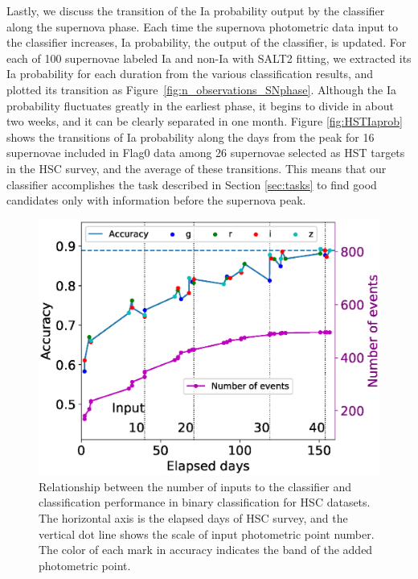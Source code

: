 \documentclass[useamsfonts]{pasj01}
\begin{document}
Lastly, we discuss the transition of the Ia probability output by the classifier along the supernova phase.
Each time the supernova photometric data input to the classifier increases, Ia probability, the output of the classifier, is updated.
For each of 100 supernovae labeled Ia and non-Ia with SALT2 fitting, we extracted its Ia probability for each duration from the various classification results, and plotted its transition as Figure\ \ref{fig:n_observations_SNphase}.
Although the Ia probability fluctuates greatly in the earliest phase, it begins to divide in about two weeks, and it can be clearly separated in one month.
Figure \ref{fig:HSTIaprob} shows the transitions of Ia probability along the days from the peak for 16 supernovae included in Flag0 data among 26 supernovae selected as HST targets in the HSC survey, and the average of these transitions.
This means that our classifier accomplishes the task described in Section \ref{sec:tasks} to find good candidates only with information before the supernova peak.
%
\begin{figure}[ht]
  \begin{center}
     \includegraphics[width=\columnwidth]{figures/n_observations_v2.eps}
  \end{center}
  \caption{%
  Relationship between the number of inputs to the classifier and classification performance in binary classification for HSC datasets. 
  The horizontal axis is the elapsed days of HSC survey, and the vertical dot line shows the scale of input photometric point number. 
  The color of each mark in accuracy indicates the band of the added photometric point.
  }%
  \label{fig:n_observations}
\end{figure}
\end{document}
